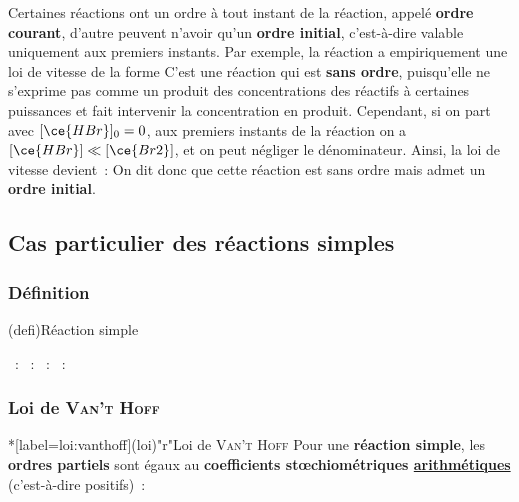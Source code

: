\documentclass[../../main/main.tex]{subfiles}
\begin{document}
Certaines réactions ont un ordre à tout instant de la réaction, appelé
\textbf{ordre courant}, d'autre peuvent n'avoir qu'un \textbf{ordre initial},
c'est-à-dire valable uniquement aux premiers instants. Par exemple, la réaction
\psw{
	\[\ce{Br2\gaz{} + H2\gaz{} = 2HBr\gaz{}}\]
}
a empiriquement une loi de vitesse de la forme
\psw{
	\[
		v = \frac{k[\ce{H2}]\times[\ce{Br2}]^{1/2}}
		{1+k' \frac{[\ce{HBr}]}{[\ce{Br2}]}}
	\]
}
\noindent
C'est une réaction qui est \textbf{sans ordre}, puisqu'elle ne s'exprime pas
comme un produit des concentrations des réactifs à certaines puissances et fait
intervenir la concentration en produit.
\smallbreak
Cependant, si on part avec $[\ce{HBr}]_0 =
	0$, aux premiers instants de la réaction on a $[\ce{HBr}] \ll [\ce{Br2}]$, et on
peut négliger le dénominateur. Ainsi, la loi de vitesse devient~:
\psw{
	\[v \Sim_{t\to 0} k [\ce{H2}][\ce{Br2}]^{1/2}\]
}
On dit donc que cette réaction est sans ordre mais admet un \textbf{ordre initial}.

\subsection{Cas particulier des réactions simples}
\subsubsection{Définition}
\begin{tcb}[label=def:reacsimple](defi){Réaction simple}
	\begin{itemize}
		~:
		~:
		~:
		~:
	\end{itemize}
\end{tcb}

\subsubsection{Loi de \textsc{Van't Hoff}}
\begin{tcb}*[label=loi:vanthoff](loi)"r"{Loi de \textsc{Van't Hoff}}
	Pour une \textbf{réaction simple}, les \textbf{ordres partiels} sont égaux
	au \textbf{coefficients stœchiométriques \underline{arithmétiques}}
	(c'est-à-dire positifs)~:
	\psw{
	\[
		\boxed{v = k[{\ce{A}}]^{\left| \nu_{\ce{A}} \right|}
				[{\ce{B}}]^{\left| \nu_{\ce{B}} \right|}}
		\Longleftrightarrow
		\boxed{v = k\prod_{i=1}^{p}[{\ce{R}}_i]^{\left| \nu_i \right|}}
	\]
	}
\end{tcb}
\end{document}

